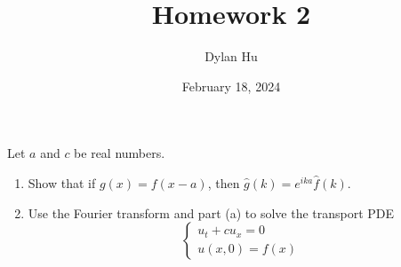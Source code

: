\documentclass[plain]{pset}
\title{Homework 2}
\author{Dylan Hu}
\date{February 18, 2024}
\begin{document}
\begin{multicols}{2}
    \raggedcolumns{}
    \maketitle
    \columnbreak{}
    \tableofcontents
\end{multicols}

\setlength{\parskip}{1em}

\pagebreak

\begin{problem}
Let \(a\) and \(c\) be real numbers.
\begin{enumerate}[label = (\alph*)]
    \item Show that if \(g(x) = f(x - a)\), then \(\hat{g}(k) = e^{ika}\hat{f}(k)\).
    \item Use the Fourier transform and part (a) to solve the transport PDE
          \[
              \begin{cases}
                  u_t + cu_x = 0 \\
                  u(x, 0) = f(x)
              \end{cases}
          \]
\end{enumerate}
\end{problem}
\end{document}
